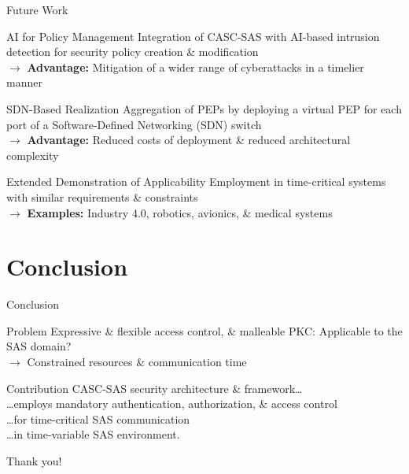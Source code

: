 \documentclass[en]{sdqbeamer}
\begin{document}
\begin{frame}{Future Work}
    \begin{blueblock}{AI for Policy Management}
        Integration of CASC-SAS with AI-based intrusion detection for security policy creation \& modification
        \\$\rightarrow$ \textbf{Advantage:} Mitigation of a wider range of cyberattacks in a timelier manner
    \end{blueblock}
    \begin{blueblock}{SDN-Based Realization}
        Aggregation of PEPs by deploying a virtual PEP for each port of a Software-Defined Networking (SDN) switch
        \\$\rightarrow$ \textbf{Advantage:} Reduced costs of deployment \& reduced architectural complexity
    \end{blueblock}
    \begin{blueblock}{Extended Demonstration of Applicability}
        Employment in time-critical systems with similar requirements \& constraints
        \\$\rightarrow$ \textbf{Examples:} Industry 4.0, robotics, avionics, \& medical systems
    \end{blueblock}
\end{frame}

\section{Conclusion}
\begin{frame}{Conclusion}
    \begin{redblock}{Problem}
        Expressive \& flexible access control, \& malleable PKC: Applicable to the SAS domain?
        \\$\rightarrow$ Constrained resources \& communication time
    \end{redblock}
    \begin{blueblock}{Contribution}
        CASC-SAS security architecture \& framework\dots
        \\\dots employs mandatory authentication, authorization, \& access control
        \\\dots for time-critical SAS communication
        \\\dots in time-variable SAS environment.
    \end{blueblock}
    \vspace{0.5em}
    \centering
    \huge
    Thank you!
\end{frame}
\end{document}
